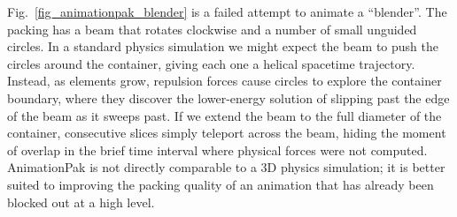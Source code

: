 Fig.~\ref{fig_animationpak_blender} is a failed attempt to animate a ``blender''.
The packing has a beam that rotates clockwise
and a number of small unguided circles.  
In a standard physics simulation we might expect the beam to push the 
circles around the container, giving each one a helical spacetime 
trajectory.
Instead, as elements grow, repulsion forces cause circles to explore the 
container boundary, where they discover the lower-energy solution of 
slipping past the edge of the beam as it sweeps past.
If we extend the beam to the full diameter of the container,
consecutive slices simply teleport across the beam, hiding the moment of
overlap in the brief time interval where physical forces were not computed.
AnimationPak is not directly comparable to a
3D physics simulation; it is better suited to improving the
packing quality of an animation that has already been blocked out at a 
high level.

